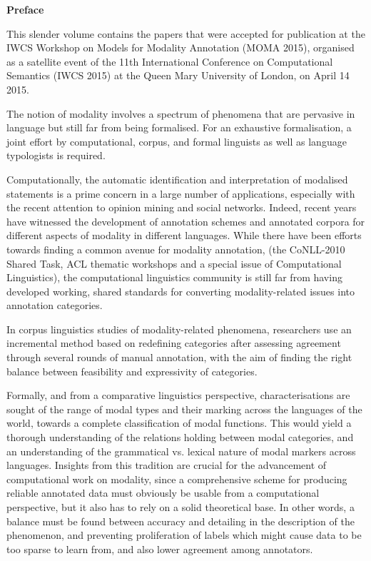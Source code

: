 \documentclass[11pt]{article}
\begin{document}
\begin{center}
  {\Large \bf Preface}
\end{center}

\vspace*{0.5cm}


This slender volume contains the papers that were accepted for publication at the IWCS Workshop on Models for Modality Annotation (MOMA 2015), organised as a satellite event of the 11th International Conference on Computational Semantics (IWCS 2015) at the Queen Mary University of London, on April 14 2015.


The notion of modality involves a spectrum of phenomena that are pervasive in language but still far from being formalised. For an exhaustive formalisation, a joint effort by computational, corpus, and formal linguists as well as language typologists is required. 

Computationally, the automatic identification and interpretation of modalised statements is a prime concern in a large number of applications, especially with the recent attention to opinion mining and social networks. Indeed, recent years have witnessed the development of annotation schemes and annotated corpora for different aspects of modality in different languages. While there have been efforts towards finding a common avenue for modality annotation, (the CoNLL-2010 Shared Task, ACL thematic workshops and a special issue of Computational Linguistics), the computational linguistics community is still far from having developed working, shared standards for converting modality-related issues into annotation categories.

In corpus linguistics studies of modality-related phenomena, researchers use an incremental method based on redefining categories after assessing agreement through several rounds of manual annotation, with the aim of finding the right balance between feasibility and expressivity of categories.

Formally, and from a comparative linguistics perspective, characterisations are sought of the range of modal types and their marking across the languages of the world, towards a complete classification of modal functions. This would yield a thorough understanding of the relations holding between modal categories, and an understanding of the grammatical vs. lexical nature of modal markers across languages. Insights from this tradition are crucial for the advancement of computational work on modality, since a comprehensive scheme for producing reliable annotated data must obviously be usable from a computational perspective, but it also has to rely on a solid theoretical base. In other words, a balance must be found between accuracy and detailing in the description of the phenomenon, and preventing proliferation of labels which might cause data to be too sparse to learn from, and also lower agreement among annotators.
\end{document}
